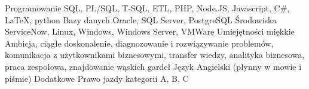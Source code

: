 

\begin{cvskills}
	\cvskill
		{Programowanie} 
		{SQL, PL/SQL, T-SQL, ETL, PHP, Node.JS, Javascript, C\#, \LaTeX, python} 
	\cvskill
		{Bazy danych} 
		{Oracle, SQL Server, PostgreSQL} 
	\cvskill
		{Środowiska} 
		{ServiceNow, Linux, Windows, Windows Server, VMWare} 
	\cvskill
		{Umiejętności miękkie} 
		{Ambicja, ciągłe doskonalenie, diagnozowanie i rozwiązywanie problemów, komunikacja z użytkownikami biznesowymi, \newline transfer wiedzy, analityka biznesowa, praca zespołowa, znajdowanie wąskich gardeł} 
	\cvskill
		{Język}
		{Angielski (płynny w mowie i piśmie)}
	\cvskill
		{Dodatkowe}
		{Prawo jazdy kategorii A, B, C}
\end{cvskills}
